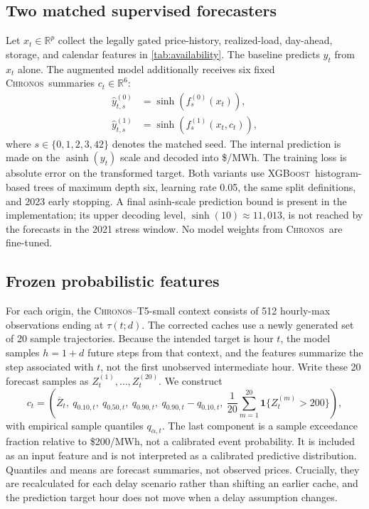 \documentclass[11pt,letterpaper]{article}
\newcommand{\MWh}{\ensuremath{\mathrm{MWh}}}
\newcommand{\Chronos}{\textsc{Chronos}}
\newcommand{\XGB}{\textsc{XGBoost}}
\begin{document}
\subsection{Two matched supervised forecasters}
Let $x_t\in\mathbb R^p$ collect the legally gated price-history, realized-load, day-ahead, storage, and calendar features in \cref{tab:availability}. The baseline predicts $y_t$ from $x_t$ alone. The augmented model additionally receives six fixed \Chronos\ summaries $c_t\in\mathbb R^6$:
\begin{align}
 \hat y^{(0)}_{t,s}&=\sinh\!\left(f^{(0)}_s(x_t)\right),\\
 \hat y^{(1)}_{t,s}&=\sinh\!\left(f^{(1)}_s(x_t,c_t)\right),\label{eq:models}
\end{align}
where $s\in\{0,1,2,3,42\}$ denotes the matched seed. The internal prediction is made on the $\operatorname{asinh}(y_t)$ scale and decoded into \$/\MWh. The training loss is absolute error on the transformed target. Both variants use \XGB\ histogram-based trees of maximum depth six, learning rate 0.05, the same split definitions, and 2023 early stopping. A final asinh-scale prediction bound is present in the implementation; its upper decoding level, $\sinh(10)\approx 11{,}013$, is not reached by the forecasts in the 2021 stress window. No model weights from \Chronos\ are fine-tuned.

\subsection{Frozen probabilistic features}\label{subsec:chronos}
For each origin, the \Chronos--T5-small context consists of 512 hourly-max observations ending at $\tau(t;d)$. The corrected caches use a newly generated set of 20 sample trajectories. Because the intended target is hour $t$, the model samples $h=1+d$ future steps from that context, and the features summarize the step associated with $t$, not the first unobserved intermediate hour. Write these 20 forecast samples as $Z_{t}^{(1)},\dots,Z_{t}^{(20)}$. We construct
\begin{equation}\label{eq:chronos_features}
 c_t=\left(
 \overline Z_t,\ q_{0.10,t},\ q_{0.50,t},\ q_{0.90,t},\
 q_{0.90,t}-q_{0.10,t},\
 \frac1{20}\sum_{m=1}^{20}\mathbf 1\{Z_t^{(m)}>200\}
 \right),
\end{equation}
with empirical sample quantiles $q_{\alpha,t}$. The last component is a sample exceedance fraction relative to \$200/\MWh, not a calibrated event probability. It is included as an input feature and is not interpreted as a calibrated predictive distribution. Quantiles and means are forecast summaries, not observed prices. Crucially, they are recalculated for each delay scenario rather than shifting an earlier cache, and the prediction target hour does not move when a delay assumption changes.
\end{document}
